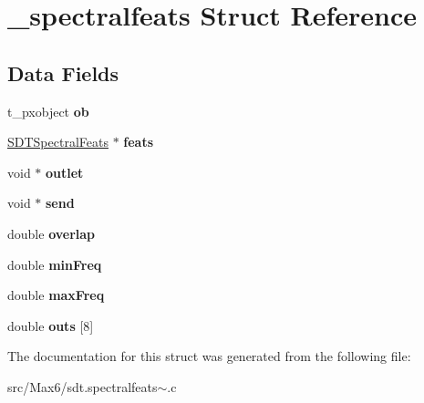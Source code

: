 \hypertarget{struct__spectralfeats}{}\section{\+\_\+spectralfeats Struct Reference}
\label{struct__spectralfeats}
\subsection*{Data Fields}
\begin{DoxyCompactItemize}
\item 
\hypertarget{struct__spectralfeats_a55b4380edb216f04a1c42b9095594963}{}t\+\_\+pxobject {\bfseries ob}\label{struct__spectralfeats_a55b4380edb216f04a1c42b9095594963}

\item 
\hypertarget{struct__spectralfeats_ac7c0b6bcdd81ac73409150ffef806c2b}{}\hyperlink{struct_s_d_t_spectral_feats}{S\+D\+T\+Spectral\+Feats} $\ast$ {\bfseries feats}\label{struct__spectralfeats_ac7c0b6bcdd81ac73409150ffef806c2b}

\item 
\hypertarget{struct__spectralfeats_a93c137f2e56e2bd3ce84cf8bf5ac0946}{}void $\ast$ {\bfseries outlet}\label{struct__spectralfeats_a93c137f2e56e2bd3ce84cf8bf5ac0946}

\item 
\hypertarget{struct__spectralfeats_ab82783be31120644484d68f0f0f03615}{}void $\ast$ {\bfseries send}\label{struct__spectralfeats_ab82783be31120644484d68f0f0f03615}

\item 
\hypertarget{struct__spectralfeats_aeb5a494cce1f67b74810ff267f256b9c}{}double {\bfseries overlap}\label{struct__spectralfeats_aeb5a494cce1f67b74810ff267f256b9c}

\item 
\hypertarget{struct__spectralfeats_a1848907a6bb92e1a9b609f8dc1b03fd3}{}double {\bfseries min\+Freq}\label{struct__spectralfeats_a1848907a6bb92e1a9b609f8dc1b03fd3}

\item 
\hypertarget{struct__spectralfeats_a0e25f9ce3eb6f68fffb5853d2db82b3c}{}double {\bfseries max\+Freq}\label{struct__spectralfeats_a0e25f9ce3eb6f68fffb5853d2db82b3c}

\item 
\hypertarget{struct__spectralfeats_acce23dd1973044bc8837fb4008c46010}{}double {\bfseries outs} \mbox{[}8\mbox{]}\label{struct__spectralfeats_acce23dd1973044bc8837fb4008c46010}

\end{DoxyCompactItemize}


The documentation for this struct was generated from the following file\+:\begin{DoxyCompactItemize}
\item 
src/\+Max6/sdt.\+spectralfeats$\sim$.\+c\end{DoxyCompactItemize}
